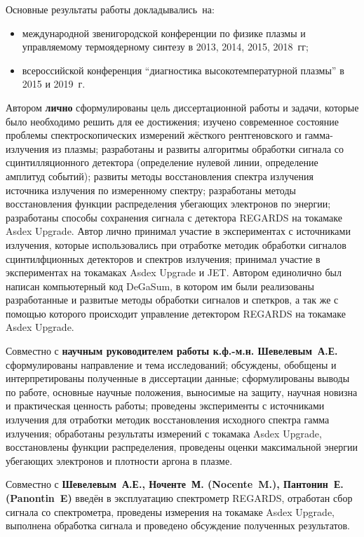 {\probation}
Основные результаты работы докладывались~на:
\begin{itemize}
  \item международной звенигородской конференции по физике плазмы и управляемому термоядерному синтезу в 2013, 2014, 2015, 2018~гг;
  \item всероссийской конференция ``диагностика высокотемпературной плазмы'' в 2015 и 2019~г.
\end{itemize}

{\contribution} Автором \textbf{лично} сформулированы цель диссертационной работы и задачи, которые было необходимо решить для ее достижения; изучено современное состояние проблемы спектроскопических измерений жёсткого рентгеновского и гамма-излучения из плазмы; разработаны и развиты алгоритмы обработки сигнала со сцинтилляционного детектора (определение нулевой линии, определение амплитуд событий); развиты методы восстановления спектра излучения источника излучения по измеренному спектру; разработаны методы восстановления функции распределения убегающих электронов по энергии; разработаны способы сохранения сигнала с детектора REGARDS на токамаке Asdex Upgrade. Автор лично принимал участие в экспериментах с источниками излучения, которые использовались при отработке методик обработки сигналов сцинтилфционных детекторов и спектров излучения; принимал участие в экспериментах на токамаках Asdex Upgrade и JET. Автором единолично был написан компьютерный код DeGaSum, в котором им были реализованы разработанные и развитые методы обработки сигналов и спеткров, а так же с помощью которого происходит управление детектором REGARDS на токамаке Asdex Upgrade.

Совместно с \textbf{научным руководителем работы к.ф.-м.н. Шевелевым~А.Е.} сформулированы направление и тема исследований; обсуждены, обобщены и интерпретированы полученные в диссертации данные; сформулированы выводы по работе, основные научные положения, выносимые на защиту, научная новизна и практическая ценность работы; проведены эксперименты с источниками излучения для отработки методик восстановления исходного спектра гамма излучения; обработаны результаты измерений с токамака Asdex Upgrade, восстановлены функции распределения, проведены оценки максимальной энергии убегающих электронов и плотности аргона в плазме.

Совместно с \textbf{Шевелевым~А.Е., Ноченте~М. (Nocente~M.), Пантонин~Е. (Panontin~E)} введён в эксплуатацию спектрометр REGARDS, отработан сбор сигнала со спектрометра, проведены измерения на токамаке Asdex Upgrade, выполнена обработка сигнала и проведено обсуждение полученных результатов.

